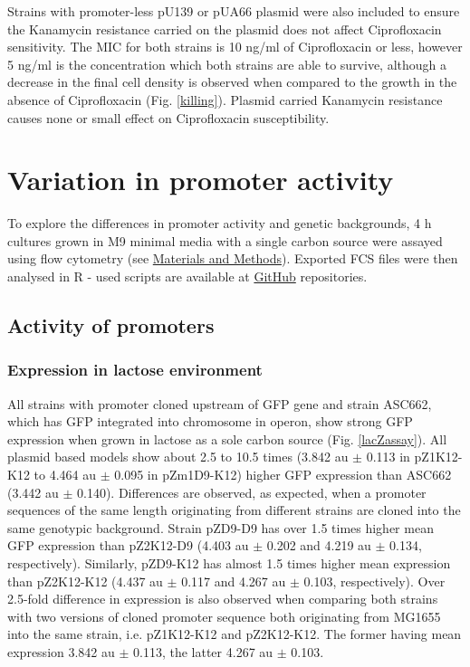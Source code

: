 Strains with promoter-less pU139 or pUA66 plasmid were also included to ensure the Kanamycin resistance carried on the plasmid does not affect Ciprofloxacin sensitivity.
The MIC for both strains is 10 ng/ml of Ciprofloxacin or less, however 5 ng/ml is the concentration which both strains are able to survive, although a decrease in the final cell density is observed when compared to the growth in the absence of Ciprofloxacin (Fig. \ref{killing}).
Plasmid carried Kanamycin resistance causes none or small effect on Ciprofloxacin susceptibility.


\section{Variation in promoter activity}
To explore the differences in promoter activity and genetic backgrounds, 4 h cultures grown in M9 minimal media with a single carbon source were assayed using flow cytometry (see \hyperlink{FC}{Materials and Methods}).
Exported FCS files were then analysed in R - used scripts are available at \href{https://github.com/marketavlkova/}{GitHub} repositories.

\subsection{Activity of  promoters}
\subsubsection{Expression in lactose environment}
All strains with  promoter cloned upstream of GFP gene and strain ASC662, which has GFP integrated into chromosome in  operon, show strong GFP expression when grown in lactose as a sole carbon source (Fig. \ref{lacZassay}).
All plasmid based models show about 2.5 to 10.5 times (3.842 au $\pm$ 0.113 in pZ1\textunderscore K12-K12 to 4.464 au $\pm$ 0.095 in pZm1\textunderscore D9-K12) higher GFP expression than ASC662 (3.442 au $\pm$ 0.140).
Differences are observed, as expected, when a promoter sequences of the same length originating from different strains are cloned into the same genotypic background.
Strain pZ\textunderscore D9-D9 has over 1.5 times higher mean GFP expression than pZ2\textunderscore K12-D9 (4.403 au $\pm$ 0.202 and 4.219 au $\pm$ 0.134, respectively).
Similarly, pZ\textunderscore D9-K12 has almost 1.5 times higher mean expression than pZ2\textunderscore K12-K12 (4.437 au $\pm$ 0.117 and 4.267 au $\pm$ 0.103, respectively).
Over 2.5-fold difference in expression is also observed when comparing both strains with two versions of cloned promoter sequence both originating from MG1655 into the same strain, i.e. pZ1\textunderscore K12-K12 and pZ2\textunderscore K12-K12.
The former having mean expression 3.842 au $\pm$ 0.113, the latter 4.267 au $\pm$ 0.103.

